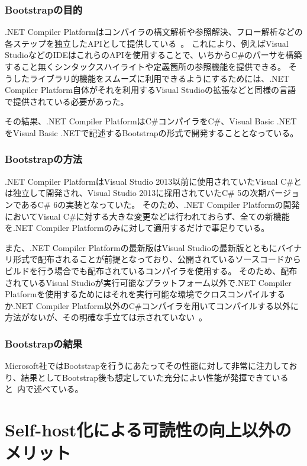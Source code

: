 \subsubsection{Bootstrapの目的}

.NET Compiler Platformはコンパイラの構文解析や参照解決、フロー解析などの各ステップを独立したAPIとして提供している~\cite{roslyn-doc}。
これにより、例えばVisual StudioなどのIDEはこれらのAPIを使用することで、いちからC\#のパーサを構築すること無くシンタックスハイライトや定義箇所の参照機能を提供できる。
そうしたライブラリ的機能をスムーズに利用できるようにするためには、.NET Compiler Platform自体がそれを利用するVisual Studioの拡張などと同様の言語で提供されている必要があった。

その結果、.NET Compiler PlatformはC\#コンパイラをC\#、Visual Basic .NETをVisual Basic .NETで記述するBootstrapの形式で開発することとなっている。

\subsubsection{Bootstrapの方法}

.NET Compiler PlatformはVisual Studio 2013以前に使用されていたVisual C\#とは独立して開発され、Visual Studio 2013に採用されていたC\# 5の次期バージョンであるC\# 6の実装となっていた。
そのため、.NET Compiler Platformの開発においてVisual C\#に対する大きな変更などは行われておらず、全ての新機能を.NET Compiler Platformのみに対して適用するだけで事足りている。

また、.NET Compiler Platformの最新版はVisual Studioの最新版とともにバイナリ形式で配布されることが前提となっており、公開されているソースコードからビルドを行う場合でも配布されているコンパイラを使用する。
そのため、配布されているVisual Studioが実行可能なプラットフォーム以外で.NET Compiler Platformを使用するためにはそれを実行可能な環境でクロスコンパイルするか.NET Compiler Platform以外のC\#コンパイラを用いてコンパイルする以外に方法がないが、その明確な手立ては示されていない~\cite{roslyn-cross-platform}。

\subsubsection{Bootstrapの結果}

Microsoft社ではBootstrapを行うにあたってその性能に対して非常に注力しており、結果としてBootstrap後も想定していた充分によい性能が発揮できていると~\cite{roslyn-performance}内で述べている。


\section{Self-host化による可読性の向上以外のメリット}
\label{side-effect:swift:merit}

